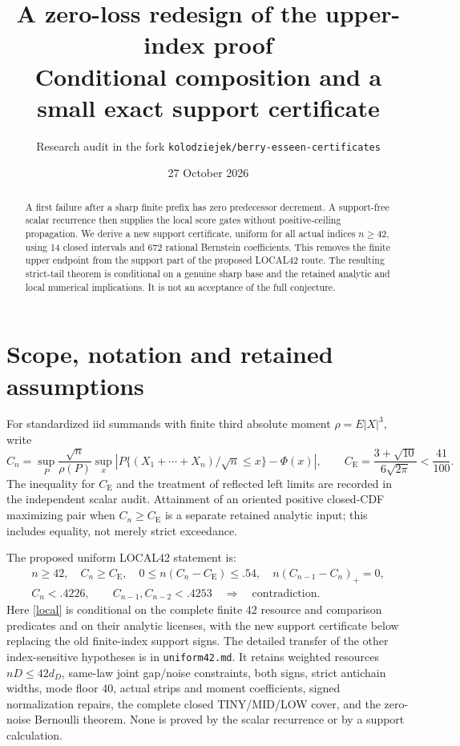 \documentclass[11pt]{article}
\title{A zero-loss redesign of the upper-index proof\\
\large Conditional composition and a small exact support certificate}
\author{Research audit in the fork \texttt{kolodziejek/berry-esseen-certificates}}
\date{27 October 2026}
\newcommand{\CE}{C_{\mathrm E}}
\begin{document}
\maketitle
\begin{abstract}
A first failure after a sharp finite prefix has zero predecessor decrement.
A support-free scalar recurrence then supplies the local score gates without
positive-ceiling propagation. We derive a new support certificate, uniform
for all actual indices $n\ge42$, using 14 closed intervals and 672 rational
Bernstein coefficients. This removes the finite upper endpoint from the
support part of the proposed LOCAL42 route. The resulting strict-tail theorem
is conditional on a genuine sharp base and the retained analytic and local
numerical implications. It is not an acceptance of the full conjecture.
\end{abstract}

\section{Scope, notation and retained assumptions}
For standardized iid summands with finite third absolute moment
$\rho=E|X|^3$, write
\[
 C_n=\sup_P\frac{\sqrt n}{\rho(P)}
       \sup_x\left|P\{(X_1+\cdots+X_n)/\sqrt n\le x\}-\Phi(x)\right|,
 \qquad \CE=\frac{3+\sqrt{10}}{6\sqrt{2\pi}}<\frac{41}{100}.
\]
The inequality for $\CE$ and the treatment of reflected left limits are
recorded in the independent scalar audit. Attainment of an oriented positive
closed-CDF maximizing pair when $C_n\ge\CE$ is a separate retained analytic
input; this includes equality, not merely strict exceedance.

The proposed uniform LOCAL42 statement is:
\begin{equation}\label{local}
\begin{gathered}
 n\ge42,\quad C_n\ge\CE,\quad
 0\le n(C_n-\CE)\le .54,\quad n(C_{n-1}-C_n)_+=0,\\
 C_n<.4226,\qquad C_{n-1},C_{n-2}<.4253
 \quad\Longrightarrow\quad\text{contradiction}.
\end{gathered}
\end{equation}
Here \eqref{local} is conditional on the complete finite 42 resource and
comparison predicates and on their analytic licenses, with the new support
certificate below replacing the old finite-index support signs.
The detailed transfer of the other index-sensitive hypotheses is in
\texttt{uniform42.md}. It retains weighted resources $nD\le42d_D$,
same-law joint gap/noise constraints, both signs, strict antichain widths,
mode floor 40, actual strips and moment coefficients, signed normalization
repairs, the complete closed TINY/MID/LOW cover, and the zero-noise Bernoulli
theorem. None is proved by the scalar recurrence or by a support calculation.
\end{document}
